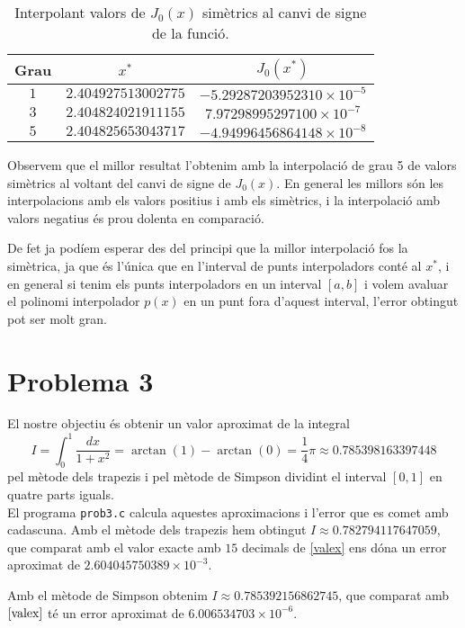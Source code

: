 \documentclass[12pt]{article}
\numberwithin{table}{section}
\numberwithin{figure}{section}
\numberwithin{equation}{section}
\begin{document}
\begin{table}[h!]
	\centering
	\caption{Interpolant valors de $J_0(x)$ simètrics al canvi de signe de la funció.}	
	\begin{tabular}{c|c|c}
		Grau & $x^*$ &$J_0(x^*)$\\
		\hline
		\hline
		$1$ & $2.404927513002775$  &$-5.29287203952310\times10^{-5}$\\
		$3$ & $2.404824021911155$ &$7.97298995297100\times10^{-7}$\\
		$5$ & $2.404825653043717$ &$-4.94996456864148\times10^{-8}
		$\\
	\end{tabular}
\end{table}
Observem que el millor resultat l'obtenim amb la interpolació de grau 5 de valors simètrics al voltant del canvi de signe de $J_0(x)$. En general les millors són les interpolacions amb els valors positius i amb els simètrics, i la interpolació amb valors negatius és prou dolenta en comparació.

De fet ja podíem esperar des del principi que la millor interpolació fos la simètrica, ja que és l'única que en l'interval de punts interpoladors conté al $x^*$, i en general si tenim els punts interpoladors en un interval $[a,b]$ i volem avaluar el polinomi interpolador $p(x)$ en un punt fora d'aquest interval, l'error obtingut pot ser molt gran.

\newpage
\section*{Problema 3}
El nostre objectiu és obtenir un valor aproximat de la integral
\begin{equation}\label{valex}
I=\int^{1}_0\dfrac{dx}{1+x^2}=\arctan(1)-\arctan(0)=\frac{1}{4}\pi\approx0.785398163397448
\end{equation}
pel mètode dels trapezis i pel mètode de Simpson dividint el interval $[0,1]$ en quatre parts iguals.\\

El programa \texttt{prob3.c} calcula aquestes aproximacions i l'error que es comet amb cadascuna. Amb el mètode dels trapezis hem obtingut $I\approx0.782794117647059$, que comparat amb el valor exacte amb $15$ decimals de \eqref{valex} ens dóna un error aproximat de $2.604045750389\times10^{-3}$.


Amb el mètode de Simpson obtenim $I\approx0.785392156862745$, que comparat amb $\eqref{valex}$ té un error aproximat de $6.006534703\times10^{-6}$.
\end{document}
